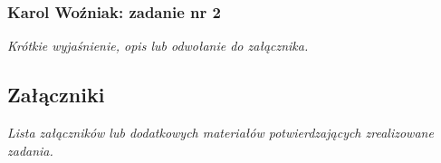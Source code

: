 \documentclass[12pt,a4paper,oneside]{article}
\theoremstyle{definition}
\numberwithin{equation}{section}
\begin{document}
\subsubsection{Karol Woźniak: zadanie nr 2}
\textit{Krótkie wyjaśnienie, opis lub odwołanie do załącznika.}

\subsection{Załączniki}
\textit{Lista załączników lub dodatkowych materiałów potwierdzających zrealizowane zadania.}

%
%
%
\end{document}
